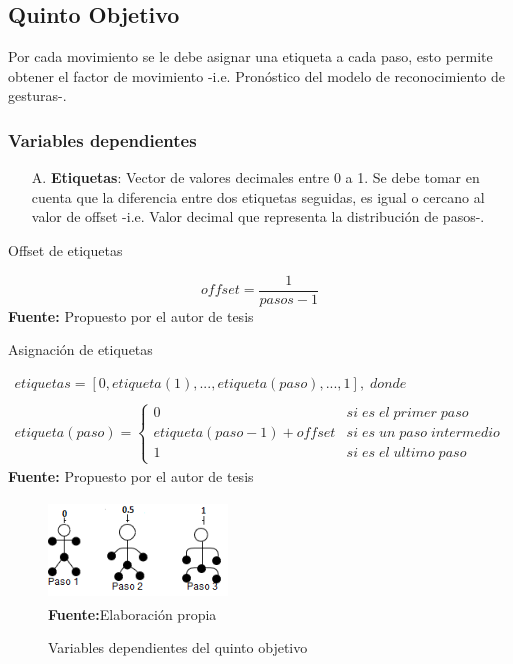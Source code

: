 \subsection{Quinto Objetivo} \label{vr:5o}
Por cada movimiento se le debe asignar una etiqueta a cada paso, esto permite obtener el factor de movimiento -i.e. Pron\'ostico del modelo de reconocimiento de gesturas-.
\subsubsection{Variables dependientes} \label{vr:5o:dep}
\begin{enumerate}
	\item[A.] \textbf{Etiquetas}: Vector de valores decimales entre 0 a 1. Se debe tomar en cuenta que la diferencia entre dos etiquetas seguidas, es igual o cercano al valor de offset -i.e. Valor decimal que representa la distribuci\'on de pasos-.  
\end{enumerate}	
\medbreak
\begin{formula}[h]
	\centering
	\caption{Offset de etiquetas}
	\label{frm:offsetEt}
	\begin{equation}
offset = \frac{1}{pasos-1}
	\end{equation}
	\textbf{Fuente:} Propuesto por el autor de tesis
\end{formula}
\medbreak
\begin{formula}[h]
	\centering
	\caption{Asignaci\'on de etiquetas}
	\label{frm:vecEtiq}
	\begin{equation}
\begin{matrix}
etiquetas=[0, etiqueta(1), ..., etiqueta(paso), ..., 1],\; donde
\\
\\
etiqueta(paso) =
\left\{\begin{matrix}
0 & si\; es\; el\; primer \; paso
\\
etiqueta(paso-1)+offset & si\; es\; un\; paso\; intermedio
\\ 
1 & si\; es\; el\; ultimo\; paso
\end{matrix}\right.
\end{matrix}
	\end{equation}
	\textbf{Fuente:} Propuesto por el autor de tesis
\end{formula}  
\medbreak
\begin{figure}[H]
	\caption{Variables dependientes del quinto objetivo}
	\label{fig:vardep5}
	\centering
	\includegraphics[width=180px,height=100px]{graphics/var-5obj.png} \\
	\textbf{Fuente:}Elaboraci\'on propia 
\end{figure}
